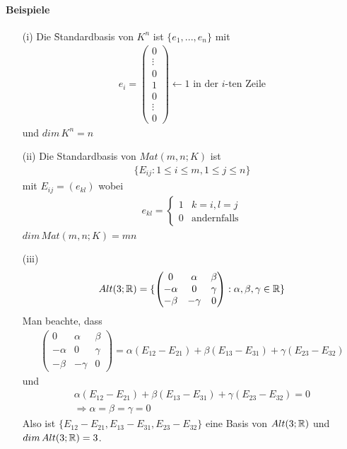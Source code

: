 \paragraph{Beispiele}
\begin{itemize}
 \item[(i)] Die \f{Standardbasis} von $K^n$ ist $\{e_1, ..., e_n\}$ mit
\begin{align}
e_i = \begin{pmatrix} 0 \\ \vdots \\ 0 \\ 1 \\ 0 \\ \vdots \\ 0 \end{pmatrix} \leftarrow \text{1 in der $i$-ten Zeile}
\end{align}
und $dim\, K^n = n$

\item[(ii)] Die Standardbasis von $Mat(m,n;K)$ ist 
\begin{align}
\{E_{ij}: 1 \leq i \leq m, 1 \leq j \leq n\}
\end{align}
mit $E_{ij} = (e_{kl})$ wobei
\begin{align}
e_{kl} = \left\{ \begin{matrix} 1 & k=i, l=j \\ 0 & \text{andernfalls}\end{matrix}\right.
\end{align}
$dim\, Mat(m,n;K) = mn$

\item[(iii)]
\begin{align}
Alt(3; \mathbb{R}) = \{ \begin{pmatrix} 0 & \alpha & \beta \\ -\alpha & 0 & \gamma \\ -\beta & -\gamma & 0\end{pmatrix}: \alpha, \beta, \gamma \in \mathbb{R} \}
\end{align}
Man beachte, dass 
\begin{align}
\begin{pmatrix} 0 & \alpha & \beta \\ -\alpha & 0 & \gamma \\ -\beta & -\gamma & 0\end{pmatrix} = \alpha(E_{12} - E_{21}) + \beta(E_{13} - E_{31}) + \gamma (E_{23}-E_{32})
\end{align}
und 
\begin{align}
\alpha(E_{12} - E_{21}) + \beta(E_{13} - E_{31}) + \gamma (E_{23}-E_{32}) = 0 \\
\Rightarrow \alpha = \beta = \gamma = 0
\end{align}
Also ist $\{E_{12}-E_{21}, E_{13}-E_{31}, E_{23}-E_{32}\}$ eine Basis von $Alt(3; \mathbb{R})$ und $dim\, Alt(3;\mathbb{R}) = 3$.


\end{itemize}
